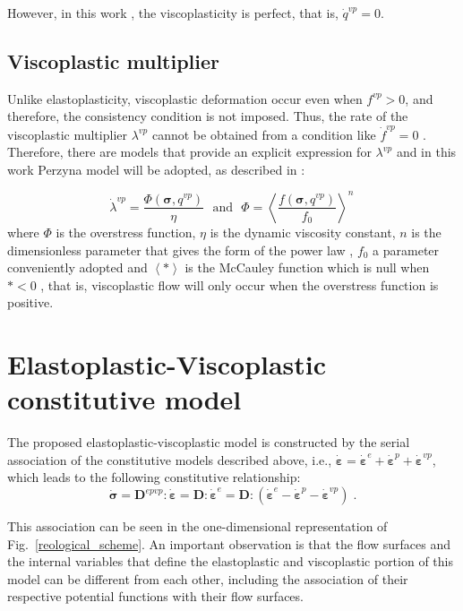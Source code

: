 \documentclass[Journal,letterpaper]{ascelike-new}
\newcommand{\Dsdee}{\boldsymbol{D}}
\newcommand{\Dsdepev}{\boldsymbol{D}^{epvp}}
\newcommand{\dstrain}{\boldsymbol{\dot{\varepsilon}}}
\newcommand{\dstraine}{\boldsymbol{\dot{\varepsilon}}^{e}}
\newcommand{\dstrainp}{\boldsymbol{\dot{\varepsilon}}^{p}}
\newcommand{\dstrainv}{\boldsymbol{\dot{\varepsilon}}^{vp}}
\newcommand{\dstress}{\boldsymbol{\dot{\sigma}}}
\newcommand{\stress}{\boldsymbol{\sigma}}
\begin{document}
However, in this work , the viscoplasticity is perfect, that is, $\dot q^{vp} = 0$.

\subsection{Viscoplastic multiplier}

Unlike elastoplasticity, viscoplastic deformation occur even when $f^{vp} > 0$, and therefore, the consistency condition is not imposed. Thus, the rate of the viscoplastic multiplier $\lambda^{vp}$ cannot be obtained from a condition like $\dot f^{vp} = 0$ . Therefore, there are models that provide an explicit expression for $\lambda^{vp}$ and in this work Perzyna model \cite{perzyna1966} will be adopted, as described in :

\begin{equation} \label{eq_perzyna_model}
	\dot \lambda^{vp} = \dfrac{\Phi(\stress,q^{vp})}{\eta}~~~\text{and}~~~\Phi = \left\langle  \dfrac{f(\stress,q^{vp})}{f_0} \right\rangle^n \,
\end{equation} where $\Phi$ is the overstress function, $\eta$ is the dynamic viscosity constant, $n$ is the dimensionless parameter that gives the form of the power law , $f_0$ a parameter conveniently adopted and $\left\langle * \right\rangle$ is the McCauley function which is null when $* <0$ , that is, viscoplastic flow will only occur when the overstress function is positive.

\section{Elastoplastic-Viscoplastic constitutive model}

The proposed elastoplastic-viscoplastic model is constructed by the serial association of the constitutive models described above, i.e., $\dstrain = \dstraine + \dstrainp + \dstrainv$, which leads to the following constitutive relationship:
\begin{equation} \label{eq_constitutive_relationship_epvp}
	\dstress = \Dsdepev : \dstrain = \Dsdee : \dstraine = \Dsdee : (\dstraine - \dstrainp - \dstrainv)\;.
\end{equation}

This association can be seen in the one-dimensional representation of Fig.~\ref{reological_scheme}. An important observation is that the flow surfaces and the internal variables that define the elastoplastic and viscoplastic portion of this model can be different from each other, including the association of their respective potential functions with their flow surfaces.
\end{document}
